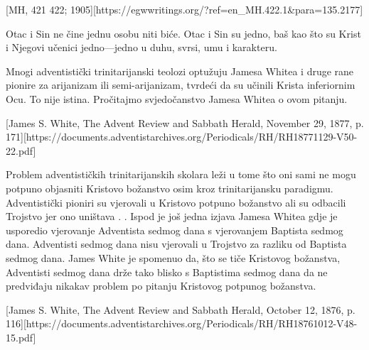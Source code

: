 [MH, 421 422; 1905][https://egwwritings.org/?ref=en\_MH.422.1&para=135.2177]

Otac i Sin ne čine jednu osobu niti biće. Otac i Sin su jedno, baš kao što su Krist i Njegovi učenici jedno—jedno u duhu, svrsi, umu i karakteru.

Mnogi adventistički trinitarijanski teolozi optužuju Jamesa Whitea i druge rane pionire za arijanizam ili semi-arijanizam, tvrdeći da su učinili Krista inferiornim Ocu. To nije istina. Pročitajmo svjedočanstvo Jamesa Whitea o ovom pitanju.


[James S. White, The Advent Review and Sabbath Herald, November 29, 1877, p. 171][https://documents.adventistarchives.org/Periodicals/RH/RH18771129-V50-22.pdf]

Problem adventističkih trinitarijanskih skolara leži u tome što oni sami ne mogu potpuno objasniti Kristovo božanstvo osim kroz trinitarijansku paradigmu. Adventistički pioniri su vjerovali u Kristovo potpuno božanstvo ali su odbacili Trojstvo jer ono uništava . . Ispod je još jedna izjava Jamesa Whitea gdje je usporedio vjerovanje Adventista sedmog dana s vjerovanjem Baptista sedmog dana. Adventisti sedmog dana nisu vjerovali u Trojstvo za razliku od Baptista sedmog dana. James White je spomenuo da, što se tiče Kristovog božanstva, Adventisti sedmog dana drže tako blisko s Baptistima sedmog dana da ne predviđaju nikakav problem po pitanju Kristovog potpunog božanstva.

[James S. White, The Advent Review and Sabbath Herald, October 12, 1876, p. 116][https://documents.adventistarchives.org/Periodicals/RH/RH18761012-V48-15.pdf]

